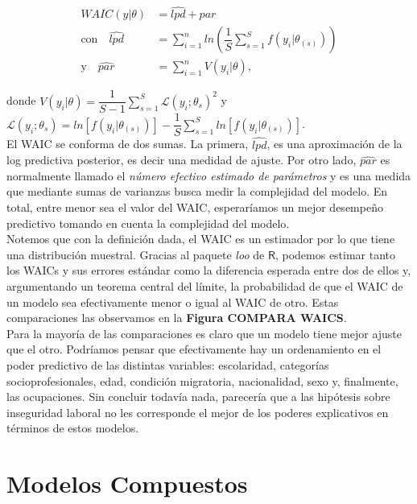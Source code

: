 \begin{align}\label{WAIC}
WAIC(y|\theta) &= \widehat{lpd} + \widehat{par} \\
\text{con} \quad \widehat{lpd} &= \sum_{i=1}^{n} ln\left(\dfrac{1}{S}\sum\limits_{s=1}^S f(y_i|\theta_{(s)}) \right) \nonumber \\
\text{y} \quad \widehat{par} &= \sum\limits_{i=1}^n V(y_i|\theta), \nonumber
\end{align}

donde $V(y_i|\theta)=\dfrac{1}{S-1}\sum\limits_{s=1}^S \mathcal{L}(y_i;\theta_{s})^2$ y $\mathcal{L}(y_i;\theta_{s}) = ln\left[f(y_i|\theta_{(s)})\right] - \dfrac{1}{S}\sum\limits_{s=1}^S ln\left[f(y_i|\theta_{(s)})\right]$.{}\\

El WAIC se conforma de dos sumas. La primera, $\widehat{lpd}$, es una aproximación de la log predictiva posterior, es decir una medidad de ajuste. Por otro lado, $\widehat{par}$ es normalmente llamado el \textit{número efectivo estimado de parámetros} y es una medida que mediante sumas de varianzas busca medir la complejidad del modelo. En total, entre menor sea el valor del WAIC, esperaríamos un mejor desempeño predictivo tomando en cuenta la complejidad del modelo.\\ 

Notemos que con la definición dada, el WAIC es un estimador por lo que tiene una distribución muestral. Gracias al paquete \textit{loo} de $\mathsf{R}$, podemos estimar tanto los WAICs y sus errores estándar como la diferencia esperada entre dos de ellos y, {\color{Red} argumentando un teorema central del límite, la probabilidad de que el WAIC de un modelo sea efectivamente menor o igual al WAIC de otro. Estas comparaciones las observamos en la \textbf{Figura COMPARA WAICS}.}\\

Para la mayoría de las comparaciones es claro que un modelo tiene mejor ajuste que el otro. Podríamos pensar que efectivamente hay un ordenamiento en el poder predictivo de las distintas variables: escolaridad, categorías socioprofesionales, edad, condición migratoria, nacionalidad, sexo y, finalmente, las ocupaciones. Sin concluir todavía nada, parecería que a las hipótesis sobre inseguridad laboral no les corresponde el mejor de los poderes explicativos en términos de estos modelos.\\

\section{Modelos Compuestos}

